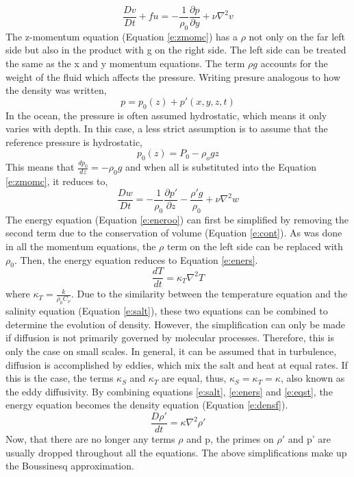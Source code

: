 \begin{equation}\label{e:ymoms}
     \frac{Dv}{Dt}+fu = - \frac{1}{\rho_0} \frac{\partial p}{\partial y} + \nu \nabla^2 v
\end{equation}
%
The z-momentum equation (Equation \protect \ref{e:zmomc}) has a $\rho$ not only on the far left side but also in the product with g on the right side.  The left side can be treated the same as the x and y momentum equations.  The term $\rho g$ accounts for the weight of the fluid which affects the pressure.  Writing presure analogous to how the density was written, 
%
\begin{equation*}
    p=p_0(z)+p'(x, y, z, t)
\end{equation*}
%
In the ocean, the pressure is often assumed hydrostatic, which means it only varies with depth.  In this case, a less strict assumption is to assume that the reference pressure is hydrostatic, 
%
\begin{equation}\label{e:pres}
    p_0(z)=P_0 - \rho_o gz
\end{equation}
%
This means that $\frac{dp_0}{dz}=-\rho_0 g$ and when all is substituted into the Equation \protect \ref{e:zmomc}, it reduces to, 
%
\begin{equation}\label{e:zmoms}
    \frac{Dw}{Dt} = -\frac{1}{\rho_0} \frac{\partial p'}{\partial z} - \frac{\rho ' g}{\rho_0} + \nu \nabla^2 w
\end{equation}
%
The energy equation (Equation \protect \ref{e:eneroo}) can first be simplified by removing the second term due to the conservation of volume (Equation \protect \ref{e:cont}).  As was done in all the momentum equations, the $\rho$ term on the left side can be replaced with $\rho_0$.  Then, the energy equation reduces to Equation \protect \ref{e:eners}.
%
\begin{equation}\label{e:eners}
    \frac{dT}{dt} = \kappa_T \nabla^2 T
\end{equation}
%
where $\kappa_T = \frac{k}{\rho_0 C_\nu}$.  Due to the similarity between the temperature equation and the salinity equation (Equation \protect \ref{e:salt}), these two equations can be combined to determine the evolution of density.  However, the simplification can only be made if diffusion is not primarily governed by molecular processes.  Therefore, this is only the case on small scales.  In general, it can be assumed that in turbulence, diffusion is accomplished by eddies, which mix the salt and heat at equal rates.  If this is the case, the terms $\kappa_S$ and $\kappa_T$ are equal, thus, $\kappa_S=\kappa_T=\kappa$, also known as the eddy diffusivity.  By combining equations \protect \ref{e:salt}, \protect \ref{e:eners} and \protect \ref{e:eqst}, the energy equation becomes the density equation (Equation \protect \ref{e:densf}).
%
\begin{equation}\label{e:densf}
    \frac{D \rho '}{dt} = \kappa \nabla ^2 \rho '
\end{equation}
%
Now, that there are no longer any terms $\rho$ and p, the primes on $\rho '$ and p' are usually dropped throughout all the equations.  The above simplifications make up the Boussinesq approximation.

